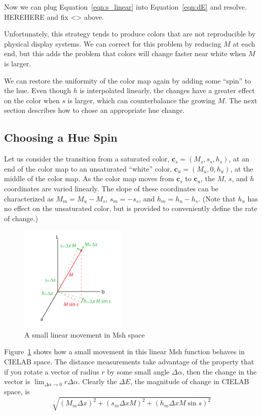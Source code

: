 \documentclass{vgtc}                          %
\newcommand{\Lab}{CIELAB\xspace}
\newcommand{\Msh}{Msh\xspace}
\newcommand{\DeltaE}{\ensuremath{\Delta{}E}\xspace}
\newcommand*{\cvec}[1]{\mathbf{#1}}
\begin{document}
Now we can plug Equation~\ref{eqn:s_linear} into Equation~\ref{eqn:dE} and
resolve.  HEREHERE and fix <> above.

Unfortunately, this strategy tends to produce colors that
are not reproducible by physical display systems.  We can correct for this
problem by reducing $M$ at each end, but this adds the problem that colors
will change faster near white when $M$ is larger.

We can restore the uniformity of the color map again by adding some
``spin'' to the hue.  Even though $h$ is interpolated linearly, the changes
have a greater effect on the color when $s$ is larger, which can
counterbalance the growing $M$.  The next section describes how to chose an
appropriate hue change.

\subsection{Choosing a Hue Spin}
\label{sec:ChoosingAHueSpin}

Let us consider the transition from a saturated color, $\cvec{c}_s=(M_s,
s_s, h_s)$, at an end of the color map to an unsaturated ``white'' color,
$\cvec{c}_u=(M_u, 0, h_u)$, at the middle of the color map.  As the
color map moves from $\cvec{c}_s$ to $\cvec{c}_u$, the $M$, $s$, and $h$
coordinates are varied linearly.  The slope of these coordinates can be
characterized as $M_m = M_u - M_s$, $s_m = -s_s$, and $h_m = h_u - h_s$.
(Note that $h_u$ has no effect on the unsaturated color, but is provided to
conveniently define the rate of change.)

\begin{figure}
  \centering
  \includegraphics[height=2in]{images/MshDeltaMovements}
  \caption{A small linear movement in \Msh space}
  \label{sec:LinearMshMovement}
\end{figure}

Figure~\ref{sec:LinearMshMovement} shows how a small movement in this
linear \Msh function behaves in \Lab space.  The distance measurements take
advantage of the property that if you rotate a vector of radius $r$ by some
small angle $\Delta\alpha$, then the change in the vector is
$\lim_{\Delta\alpha \rightarrow 0}r \Delta\alpha$.  Clearly the \DeltaE,
the magnitude of change in \Lab space, is
\begin{equation}
  \sqrt{(M_m \Delta x)^2 + (s_m \Delta x M)^2 + (h_m \Delta x M \sin s)^2}
  \label{eq:DeltaEforLinearMshMovement}
\end{equation}
\end{document}
